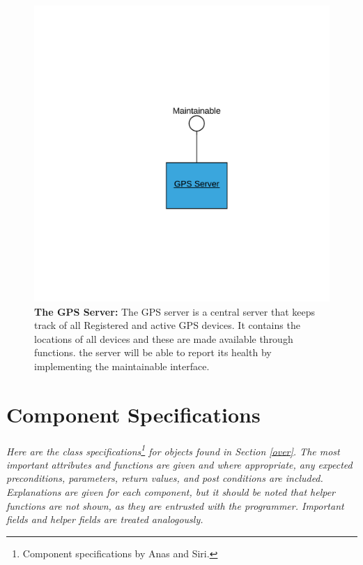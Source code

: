 \documentclass[12pt]{article}
\begin{document}
\begin{figure}[H]
    \centerline{\includegraphics[scale=.20]{GPSServer.png}}
    \caption{\textbf{The GPS Server: }The GPS server is a central server that keeps track of all Registered and active GPS devices. 
It contains the locations of all devices and these are made available through functions. the server will be able 
to report its health by implementing the maintainable interface.}
    \label{fig:GPSServer}
\end{figure}   

\section{Component Specifications} \label{specs}
\paragraph{} \textit{Here are the class specifications\footnote{Component specifications by Anas and Siri.} for objects 
found in Section \ref{over}. The most important attributes and functions are given and where appropriate, any expected 
preconditions, parameters, return values, and post conditions are included. Explanations are given for each component, but 
it should be noted that helper functions are not shown, as they are entrusted with the programmer. Important fields and helper
fields are treated analogously.}
\end{document}
